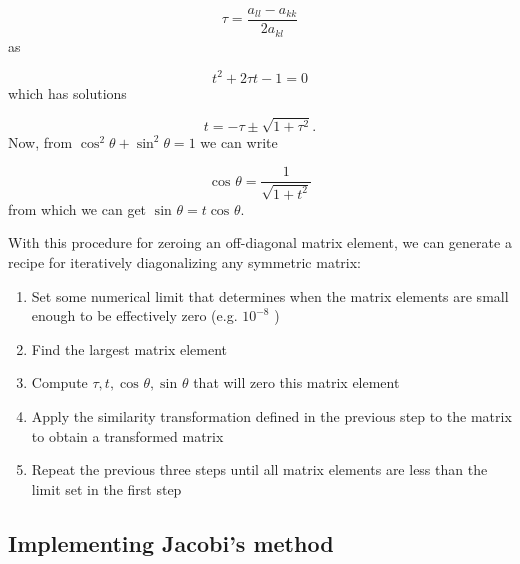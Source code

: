 \documentclass[10pt,showpacs,preprintnumbers,footinbib,amsmath,amssymb,aps,prl,twocolumn,groupedaddress,superscriptaddress,showkeys]{revtex4-1}
\newcommand{\costa}[1]{%
	\ensuremath{\cos ^{#1} {\theta}} }
\newcommand{\sinta}[1]{%
	\ensuremath{\sin ^{#1} {\theta}} }
\newcommand{\pwrten}[1]{%
	\ensuremath{10^{#1}} }
\begin{document}
{\begin{equation*}
	\tau = \frac{a _{ll} - a _{kk}}{2 a _{kl}}
\end{equation*}
as

\begin{equation*}
	t ^2  + 2 \tau t - 1 = 0
\end{equation*}
which has solutions

\begin{equation*}
	t = - \tau \pm \sqrt{1 + \tau ^2}.
\end{equation*}
Now, from $\costa{2} + \sinta{2} = 1$ we can write

\begin{equation*}
	\costa{} = \frac{1}{ \sqrt{1 + t ^2}}
\end{equation*}
from which we can get $\sinta{} = t \costa{}$.

With this procedure for zeroing an off-diagonal matrix element, we can generate
a recipe for iteratively diagonalizing any symmetric matrix:

\begin{enumerate}
	\item Set some numerical limit that determines when the matrix elements
	are small enough to be effectively zero (e.g. \pwrten{-8})
	\item Find the largest matrix element
	\item Compute $\tau,t,\costa{},\sinta{}$ that will zero this matrix element
	\item Apply the similarity transformation defined in the previous step to the
	matrix to obtain a transformed matrix
	\item Repeat the previous three steps until all matrix elements are less than
	the limit set in the first step
\end{enumerate}

\subsection{Implementing Jacobi's method}

}
\end{document}

